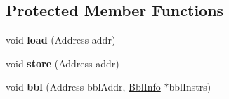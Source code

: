 \subsection*{Protected Member Functions}
\begin{DoxyCompactItemize}
\item 
\hypertarget{classSimpleCore_af229788bd793a2e7ef37b89394847a9c}{void {\bfseries load} (Address addr)}\label{classSimpleCore_af229788bd793a2e7ef37b89394847a9c}

\item 
\hypertarget{classSimpleCore_ab1d1e0268bfe241207fddb86b21f2931}{void {\bfseries store} (Address addr)}\label{classSimpleCore_ab1d1e0268bfe241207fddb86b21f2931}

\item 
\hypertarget{classSimpleCore_af8444461b888e88d01fe4a5d2c39c363}{void {\bfseries bbl} (Address bbl\-Addr, \hyperlink{structBblInfo}{Bbl\-Info} $\ast$bbl\-Instrs)}\label{classSimpleCore_af8444461b888e88d01fe4a5d2c39c363}

\end{DoxyCompactItemize}
